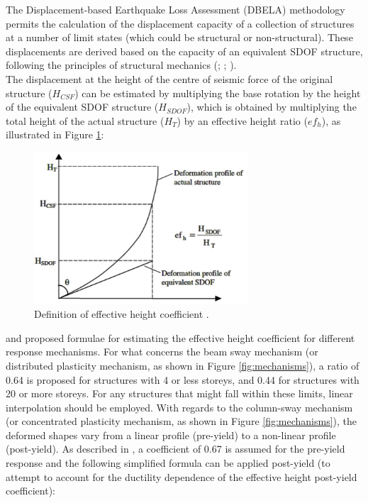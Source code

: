 The Displacement-based Earthquake Loss Assessment (DBELA) methodology permits the calculation of the displacement capacity of a collection of structures at a number of limit states (which could be structural or non-structural). These displacements are derived based on the capacity of an equivalent SDOF structure, following the principles of structural mechanics (\cite{CrowleyEtAl2004}; \cite{BalEtAl2010}; \cite{SilvaEtAl2013}).\\
The displacement at the height of the centre of seismic force of the original structure ($H_{CSF}$) can be estimated by multiplying the base rotation by the height of the equivalent SDOF structure ($H_{SDOF}$), which is obtained by multiplying the total height of the actual structure ($H_T$) by an effective height ratio ($ef_h$), as illustrated in Figure \ref{fig:efh}:

\begin{figure}[htb]
  \centering
      \includegraphics[width=8cm]{Figures/effective_height.png}
  \caption{Definition of effective height coefficient \cite{GlaisterPinho2003}.}
  \label{fig:efh}
\end{figure}
 
\cite{PinhoEtAl2002} and \cite{GlaisterPinho2003} proposed formulae for estimating the effective height coefficient for different response mechanisms. For what concerns the beam sway mechanism (or distributed plasticity mechanism, as shown in Figure \ref{fig:mechanisms}), a ratio of 0.64 is proposed for structures with 4 or less storeys, and 0.44 for structures with 20 or more storeys. For any structures that might fall within these limits, linear interpolation should be employed. With regards to the column-sway mechanism (or concentrated plasticity mechanism, as shown in Figure \ref{fig:mechanisms}), the deformed shapes vary from a linear profile (pre-yield) to a non-linear profile (post-yield). As described in \cite{GlaisterPinho2003}, a coefficient of 0.67 is assumed for the pre-yield response and the following simplified formula can be applied post-yield (to attempt to account for the ductility dependence of the effective height post-yield coefficient):
 
